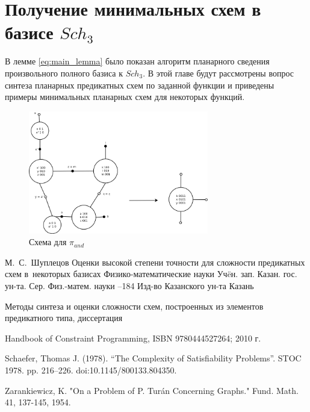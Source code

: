 \documentclass[12pt]{article}
\begin{document}
\clearpage
\section{Получение минимальных схем в базисе $Sch_3$}
В лемме \ref{eq:main_lemma} было показан алгоритм планарного сведения произвольного полного базиса к $Sch_3$. 
В этой главе будут рассмотрены вопрос синтеза планарных предикатных схем по заданной функции и 
приведены примеры минимальных планарных схем для некоторых функций.


\begin{figure}[htb]
\centering
\includegraphics[width=0.7\textwidth]{min_and.png}
\caption{Схема для $\pi_{and}$}
\label{fig:and}
\end{figure}

\clearpage
{}
    \by М.~С.~Шуплецов
    \paper Оценки высокой степени точности для сложности предикатных схем в~некоторых базисах
    \inbook Физико-математические науки
    \serial Уч\"eн. зап. Казан. гос. ун-та. Сер. Физ.-матем. науки
    --184
    \publ Изд-во Казанского ун-та
    \publaddr Казань

Методы синтеза и оценки сложности схем, построенных из элементов предикатного типа, диссертация

 Handbook of Constraint Programming, ISBN 9780444527264; 2010 г.

 Schaefer, Thomas J. (1978). 
``The Complexity of Satisfiability Problems''. STOC 1978. pp. 216–226. doi:10.1145/800133.804350.

 Zarankiewicz, K. "On a Problem of P. Turán Concerning Graphs." Fund. Math. 41, 137-145, 1954. 
\end{document}
